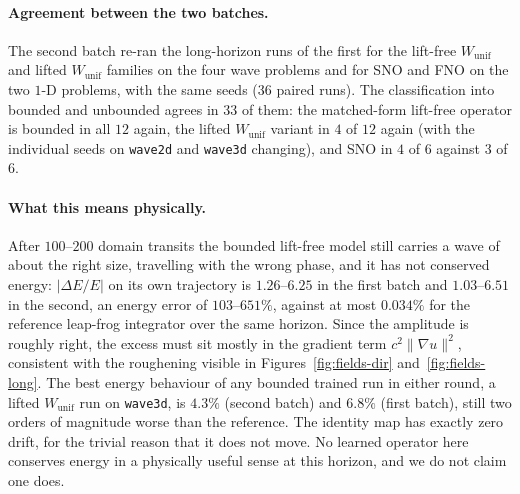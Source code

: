 \documentclass[11pt]{article}
\theoremstyle{definition}
\theoremstyle{remark}
\newcommand{\Wu}{W_{\mathrm{unif}}}
\begin{document}
\paragraph{Agreement between the two batches.} The second batch re-ran the
long-horizon runs of the first for the lift-free $\Wu$ and lifted $\Wu$ families on
the four wave problems and for SNO and FNO on the two $1$-D problems, with the
same seeds ($36$ paired runs). The classification into bounded and unbounded agrees in $33$
of them: the matched-form lift-free operator is bounded in all $12$ again, the
lifted $\Wu$ variant in $4$ of $12$ again (with the individual seeds on
\texttt{wave2d} and \texttt{wave3d} changing), and SNO in $4$ of $6$ against $3$ of $6$.

\paragraph{What this means physically.} After $100$--$200$ domain transits the
bounded lift-free model still carries a wave of about the right size, travelling
with the wrong phase, and it has not conserved energy: $|\Delta E/E|$ on its own
trajectory is $1.26$--$6.25$ in the first batch and $1.03$--$6.51$ in the
second, an energy error of $103$--$651\%$, against at most $0.034\%$ for the
reference leap-frog integrator over the same horizon. Since
the amplitude is roughly right, the excess must sit mostly in the gradient term
$c^{2}\lVert\nabla u\rVert^{2}$, consistent with the roughening visible in
Figures~\ref{fig:fields-dir} and~\ref{fig:fields-long}. The best energy
behaviour of any bounded trained run in either round, a lifted $\Wu$ run on
\texttt{wave3d}, is $4.3\%$ (second batch) and $6.8\%$ (first batch), still two orders
of magnitude worse than the reference. The identity map has exactly zero drift,
for the trivial reason that it does not move. No learned operator here conserves
energy in a physically useful sense at this horizon, and we do not claim one
does.
\end{document}
